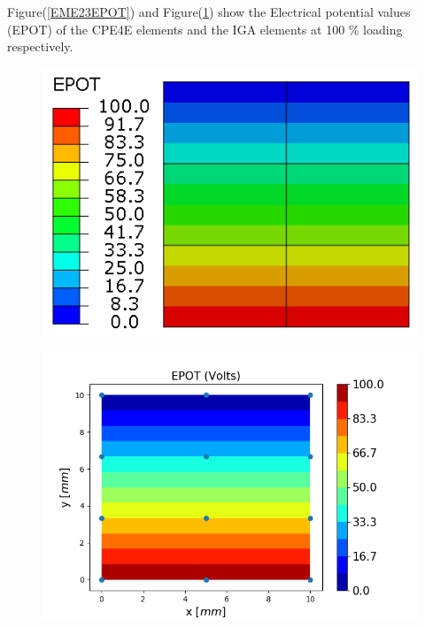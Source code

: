 \documentclass[12pt]{article}
\begin{document}
Figure(\ref{EME23EPOT}) and Figure(\ref{EME23EPOT_IGA}) show the Electrical potential values (EPOT) of the CPE4E elements and the IGA elements at 100 \% loading respectively. \\
\begin{figure}[H]
	\centering
	\begin{minipage}{.5\textwidth}
		\centering
		\includegraphics[width=1\linewidth]{EME23EPOT.png}
		\label{EME23EPOT}
	\end{minipage}%
	\begin{minipage}{.6\textwidth}
		\centering
		\includegraphics[width=1\linewidth]{EME23EPOT_IGA.png}
		\label{EME23EPOT_IGA}
	\end{minipage}
\end{figure}
\end{document}
